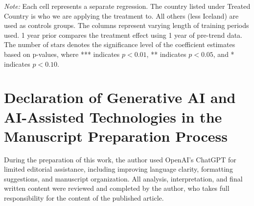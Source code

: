\documentclass[12pt]{article}
\begin{document}
\begin{table}
\caption{Two-Way F.E. Treatment Estimate}\label{tab:DID}
\centering
\resizebox{\textwidth}{!}{%

}
  \begin{tablenotes}
    \footnotesize
    \item \textit{Note:} Each cell represents a separate regression. The country listed under Treated Country is who we are applying the treatment to. All others (less Iceland) are used as controls groups. The columns represent varying length of training periods used. 1 year prior compares the treatment effect using 1 year of pre-trend data. The number of stars denotes the significance level of the coefficient estimates based on p-values, where *** indicates $p<0.01$, ** indicates $p<0.05$, and * indicates $p<0.10$.
  \end{tablenotes}
\end{table}


\setlength{\parskip}{\baselineskip}
\pagebreak

\section*{Declaration of Generative AI and AI-Assisted Technologies in the Manuscript Preparation Process}

During the preparation of this work, the author used OpenAI's ChatGPT for limited editorial assistance, including improving language clarity, formatting suggestions, and manuscript organization. All analysis, interpretation, and final written content were reviewed and completed by the author, who takes full responsibility for the content of the published article.

\clearpage


\clearpage


\end{document}
